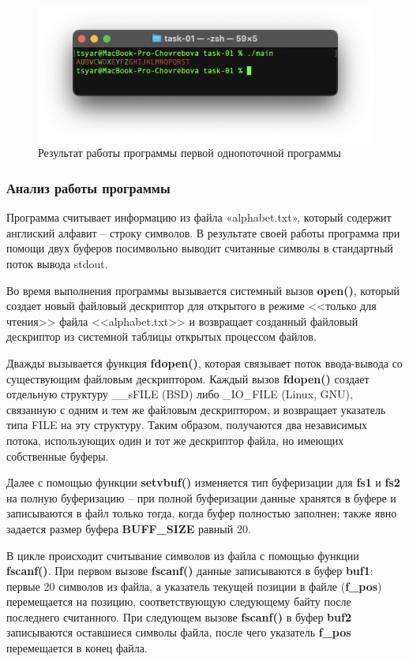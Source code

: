 \newpage
\begin{figure}[h!] 
	\centering
	\includegraphics[width=1.0\textwidth]{./img/first-01.png}
	\caption{Результат работы программы первой однопоточной программы}
	\label{fig:1}
\end{figure}

\subsubsection*{Анализ работы программы}

Программа считывает информацию из файла «alphabet.txt», который содержит англиский алфавит -- строку символов. В результате своей работы программа при помощи двух буферов посимвольно выводит считанные символы в стандартный поток вывода stdout.

Во время выполнения программы вызывается системный вызов \textbf{open()}, который создает новый файловый дескриптор для открытого в режиме <<только для чтения>> файла <<alphabet.txt>>  и возвращает созданный файловый дескриптор из системной таблицы открытых процессом файлов.

Дважды вызывается функция \textbf{fdopen()}, которая связывает поток ввода-вывода со существующим файловым дескриптором. Каждый вызов \textbf{fdopen()} создает отдельную структуру \_\_sFILE (BSD) либо \_IO\_FILE (Linux, GNU), связанную с одним и тем же файловым дескриптором, и возвращает указатель типа FILE на эту структуру. Таким образом, получаются два независимых потока, использующих один и тот же дескриптор файла, но имеющих собственные буферы.

Далее с помощью функции \textbf{setvbuf()} изменяется тип буферизации для \textbf{fs1} и \textbf{fs2} на полную буферизацию -- при полной буферизации данные хранятся в буфере и записываются в файл только тогда, когда буфер полностью заполнен; также явно задается размер буфера \textbf{BUFF\_SIZE} равный 20.

В цикле происходит считывание символов из файла с помощью функции  \textbf{fscanf()}.
При первом вызове  \textbf{fscanf()} данные записываются в буфер  \textbf{buf1}: первые 20 символов из файла, а указатель текущей позиции в файле (\textbf{f\_pos}) перемещается на позицию, соответствующую следующему байту после последнего считанного.
При следующем вызове  \textbf{fscanf()} в буфер \textbf{buf2} записываются оставшиеся символы файла, после чего указатель \textbf{f\_pos} перемещается в конец файла.

